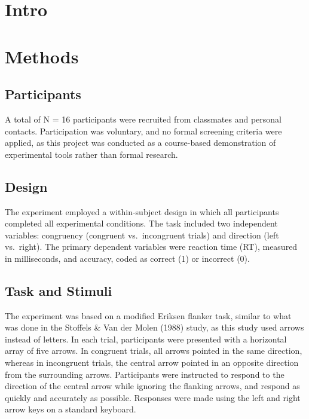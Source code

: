 \documentclass[
  authoryear,
  preprint]{elsarticle}
\begin{document}
\section{Intro}\label{intro}

\section{Methods}\label{methods}

\subsection{Participants}\label{participants}

A total of N = 16 participants were recruited from classmates and
personal contacts. Participation was voluntary, and no formal screening
criteria were applied, as this project was conducted as a course-based
demonstration of experimental tools rather than formal research.

\subsection{Design}\label{design}

The experiment employed a within-subject design in which all
participants completed all experimental conditions. The task included
two independent variables: congruency (congruent vs.~incongruent trials)
and direction (left vs.~right). The primary dependent variables were
reaction time (RT), measured in milliseconds, and accuracy, coded as
correct (1) or incorrect (0).

\subsection{Task and Stimuli}\label{task-and-stimuli}

The experiment was based on a modified Eriksen flanker task, similar to
what was done in the Stoffels \& Van der Molen (1988) study, as this
study used arrows instead of letters. In each trial, participants were
presented with a horizontal array of five arrows. In congruent trials,
all arrows pointed in the same direction, whereas in incongruent trials,
the central arrow pointed in an opposite direction from the surrounding
arrows. Participants were instructed to respond to the direction of the
central arrow while ignoring the flanking arrows, and respond as quickly
and accurately as possible. Responses were made using the left and right
arrow keys on a standard keyboard.
\end{document}
